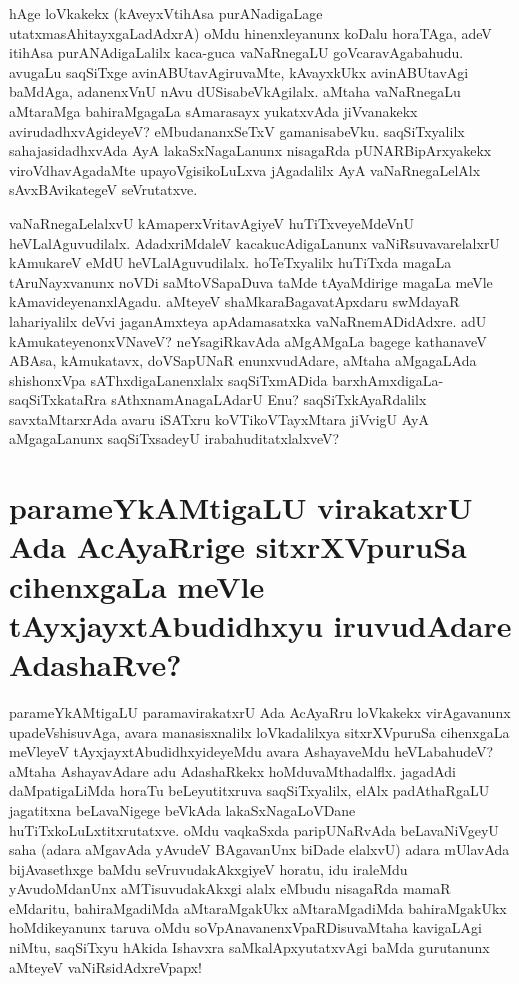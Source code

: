 hAge loVkakekx (kAveyxVtihAsa purANadigaLage utatxmasAhitayxgaLadAdxrA) oMdu hinenxleyanunx koDalu horaTAga, adeV itihAsa purANAdigaLalilx kaca-guca vaNaRnegaLU goVcaravAgabahudu. avugaLu saqSiTxge avinABUtavAgiruvaMte, kAvayxkUkx avinABUtavAgi baMdAga, adanenxVnU nAvu dUSisabeVkAgilalx. aMtaha vaNaRnegaLu aMtaraMga bahiraMgagaLa sAmarasayx yukatxvAda jiVvanakekx avirudadhxvAgideyeV? eMbudananxSeTxV gamanisabeVku. saqSiTxyalilx sahajasidadhxvAda AyA lakaSxNagaLanunx nisagaRda pUNARBipArxyakekx  viroVdhavAgadaMte upayoVgisikoLuLxva jAgadalilx AyA vaNaRnegaLelAlx sAvxBAvikategeV seVrutatxve.

vaNaRnegaLelalxvU kAmaperxVritavAgiyeV huTiTxveyeMdeVnU heVLalAguvudilalx. AdadxriMdaleV kacakucAdigaLanunx vaNiRsuvavarelalxrU kAmukareV eMdU heVLalAguvudilalx. hoTeTxyalilx huTiTxda magaLa tAruNayxvanunx noVDi saMtoVSapaDuva taMde tAyaMdirige magaLa meVle kAmavideyenanxlAgadu. aMteyeV shaMkaraBagavatApxdaru swMdayaR lahariyalilx deVvi jaganAmxteya apAdamasatxka vaNaRnemADidAdxre. adU kAmukateyenonxVNaveV? neYsagiRkavAda aMgAMgaLa bagege kathanaveV ABAsa, kAmukatavx, doVSapUNaR enunxvudAdare, aMtaha aMgagaLAda shishonxVpa sAThxdigaLanenxlalx saqSiTxmADida barxhAmxdigaLa-saqSiTxkataRra sAthxnamAnagaLAdarU Enu? saqSiTxkAyaRdalilx savxtaMtarxrAda avaru iSATxru koVTikoVTayxMtara jiVvigU AyA aMgagaLanunx saqSiTxsadeyU irabahuditatxlalxveV?

\section*{parameYkAMtigaLU virakatxrU Ada AcAyaRrige  sitxrXVpuruSa cihenxgaLa meVle tAyxjayxtAbudidhxyu iruvudAdare AdashaRve?}

parameYkAMtigaLU paramavirakatxrU Ada AcAyaRru loVkakekx virAgavanunx upadeVshisuvAga, avara manasisxnalilx loVkadalilxya sitxrXVpuruSa cihenxgaLa meVleyeV tAyxjayxtAbudidhxyideyeMdu avara AshayaveMdu heVLabahudeV? aMtaha AshayavAdare adu AdashaRkekx hoMduvaMthadalflx. jagadAdi daMpatigaLiMda horaTu beLeyutitxruva saqSiTxyalilx, elAlx padAthaRgaLU jagatitxna beLavaNigege beVkAda lakaSxNagaLoVDane huTiTxkoLuLxtitxrutatxve. oMdu vaqkaSxda paripUNaRvAda beLavaNiVgeyU saha (adara aMgavAda yAvudeV BAgavanUnx biDade elalxvU) adara mUlavAda bijAvasethxge baMdu seVruvudakAkxgiyeV horatu, idu iraleMdu yAvudoMdanUnx aMTisuvudakAkxgi alalx eMbudu nisagaRda mamaR eMdaritu, bahiraMgadiMda aMtaraMgakUkx aMtaraMgadiMda bahiraMgakUkx hoMdikeyanunx taruva oMdu soVpAnavanenxVpaRDisuvaMtaha kavigaLAgi niMtu, saqSiTxyu hAkida Ishavxra saMkalApxyutatxvAgi baMda gurutanunx aMteyeV vaNiRsidAdxreVpapx!

